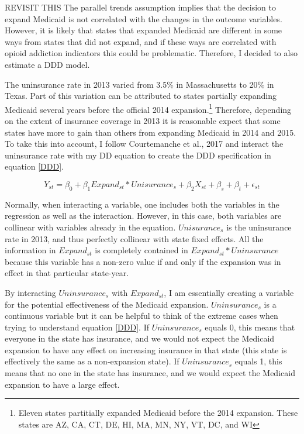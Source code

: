 \documentclass[11pt]{article}
\begin{document}
REVISIT THIS
The parallel trends assumption implies that the decision to expand Medicaid is not correlated with the changes in the outcome variables.  However, it is likely that states that expanded Medicaid are different in some ways from states that did not expand, and if these ways are correlated with opioid addiction indicators this could be problematic.  Therefore, I decided to also estimate a DDD model.   


The uninsurance rate in 2013 varied from 3.5\% in  Massachusetts to 20\% in Texas.  Part of this variation can be attributed to states partially expanding Medicaid several years before the official 2014 expansion.\footnote{Eleven states partitially expanded Medicaid before the 2014 expansion.  These states are AZ, CA, CT, DE, HI, MA, MN, NY, VT, DC, and WI}  Therefore, depending on the extent of insurance coverage in 2013 it is reasonable expect that some states have more to gain than others from expanding Medicaid in 2014 and 2015. To take this into account, I follow Courtemanche et al., 2017 and interact the uninsurance rate with my DD equation to create the DDD specification in equation \ref{DDD}.  

\begin{equation}
    Y_{st}=\beta_0+ \beta_1 Expand_{st}*Unisurance_s+\beta_2 X_{st} + \beta_s + \beta_t + \epsilon_{st}
     \label{DDD}
\end{equation}

Normally, when interacting a variable, one includes both the variables in the regression as well as the interaction.  However, in this case, both variables are collinear with variables already in the equation.  $Unisurance_s$ is the uninsurance rate in 2013, and thus perfectly collinear with state fixed effects.  All the information in $Expand_{st}$ is completely contained in $Expand_{st}*Uninsurance$ because this variable has a non-zero value if and only if the expansion was in effect in that particular state-year.  

By interacting $Uninsurance_s$ with $Expand_{st}$, I am essentially creating a variable for the potential effectiveness of the Medicaid expansion.  $Uninsurance_s$ is a continuous variable but it can be helpful to think of the extreme cases when trying to understand equation \ref{DDD}.  If $Uninsurance_s$ equals 0, this means that everyone in the state has insurance, and we would not expect the Medicaid expansion to have any effect on increasing insurance in that state (this state is effectively the same as a non-expansion state).  If $Uninsurance_s$ equals 1, this means that no one in the state has insurance, and we would expect the Medicaid expansion to have a large effect.     
\end{document}
